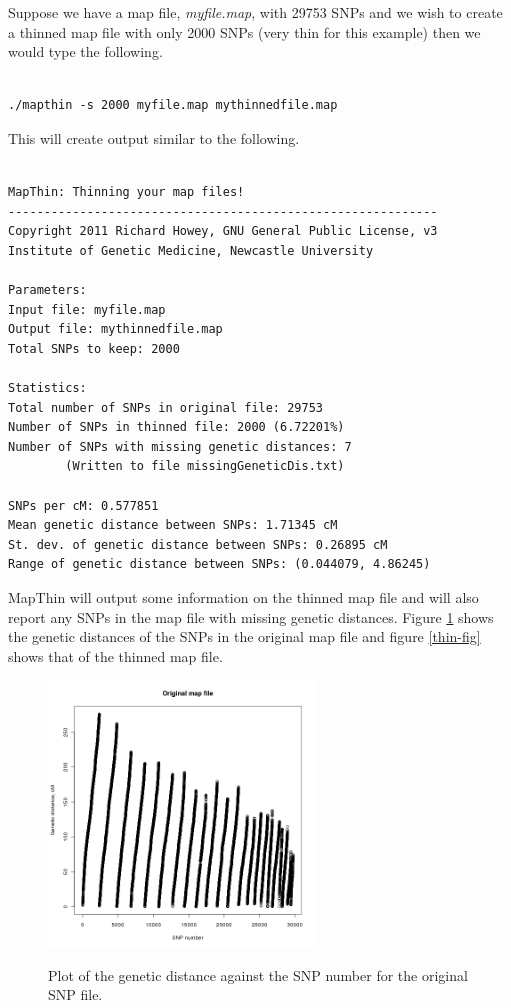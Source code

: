 \documentclass[a4paper,12pt]{article}
\begin{document}
Suppose we have a map file, {\it myfile.map}, with 29753 SNPs and we wish to create a thinned map file with only 2000 SNPs (very thin for this example) then we would type the following. 
\vspace{0.35cm} \begin{lstlisting}

./mapthin -s 2000 myfile.map mythinnedfile.map

\end{lstlisting} \vspace{0.35cm}
This will create output similar to the following. 
\vspace{0.35cm} \begin{lstlisting}

MapThin: Thinning your map files!
------------------------------------------------------------
Copyright 2011 Richard Howey, GNU General Public License, v3
Institute of Genetic Medicine, Newcastle University

Parameters:
Input file: myfile.map
Output file: mythinnedfile.map
Total SNPs to keep: 2000

Statistics: 
Total number of SNPs in original file: 29753
Number of SNPs in thinned file: 2000 (6.72201%)
Number of SNPs with missing genetic distances: 7
        (Written to file missingGeneticDis.txt)

SNPs per cM: 0.577851
Mean genetic distance between SNPs: 1.71345 cM
St. dev. of genetic distance between SNPs: 0.26895 cM
Range of genetic distance between SNPs: (0.044079, 4.86245)

\end{lstlisting} \vspace{0.35cm}
MapThin will output some information on the thinned map file and will also report any SNPs in the map file with missing genetic distances. Figure  \ref{orig-fig} shows the genetic distances of the SNPs in the original map file and figure  \ref{thin-fig} shows that of the thinned map file. 
{\begin{figure}[ht]
{\begin{center}
{\includegraphics[width=200pt]{originalMap.png}}
\caption{Plot of the genetic distance against the SNP number for the original SNP file.}
\label{orig-fig}
\end{center}}
\end{figure}
}
\end{document}
